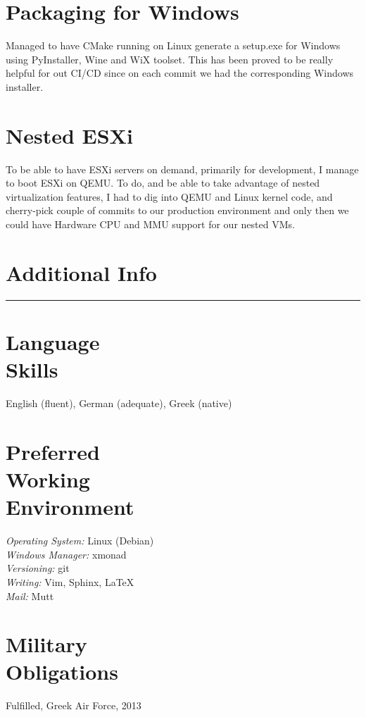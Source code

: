 \documentclass[margin,centered]{res}
\begin{document}
\begin{resume}
\section{\sc Packaging for Windows}
Managed to have CMake running on Linux generate a setup.exe for Windows using
PyInstaller, Wine and WiX toolset. This has been proved to be really helpful for
out CI/CD since on each commit we had the corresponding Windows installer.

\section{\sc Nested ESXi}
To be able to have ESXi servers on demand, primarily for development, I manage
to boot ESXi on QEMU. To do, and be able to take advantage of nested
virtualization features, I had to dig into QEMU and Linux kernel code, and
cherry-pick couple of commits to our production environment and only then we
could have Hardware CPU and MMU support for our nested VMs.


\section{Additional Info}
\rule[3pt]{\textwidth}{0.4pt}

\section{\sc Language\\Skills}
English (fluent), German (adequate), Greek (native)

\section{\sc Preferred\\Working\\Environment}
\textit{Operating System:} Linux (Debian)\\
\textit{Windows Manager:} xmonad\\
\textit{Versioning:} git\\
\textit{Writing:} Vim, Sphinx, \LaTeX\\
\textit{Mail:} Mutt

\section{\sc Military\\Obligations}
Fulfilled, Greek Air Force, 2013


\end{resume}
\end{document}
